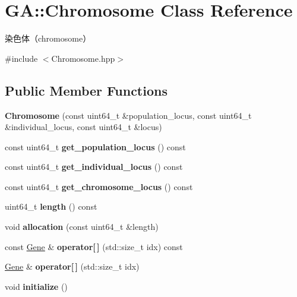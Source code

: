 \hypertarget{class_g_a_1_1_chromosome}{}\section{GA\+::Chromosome Class Reference}
\label{class_g_a_1_1_chromosome}


染色体（chromosome）  




{\ttfamily \#include $<$Chromosome.\+hpp$>$}

\subsection*{Public Member Functions}
\begin{DoxyCompactItemize}
\item 
\mbox{\label{class_g_a_1_1_chromosome_a88fbe9d3924eeb11bfdb10882dbf6b40}} 
{\bfseries Chromosome} (const uint64\+\_\+t \&population\+\_\+locus, const uint64\+\_\+t \&individual\+\_\+locus, const uint64\+\_\+t \&locus)
\item 
\mbox{\label{class_g_a_1_1_chromosome_a42d70e39ac609f2083775a3bf24ab102}} 
const uint64\+\_\+t {\bfseries get\+\_\+population\+\_\+locus} () const
\item 
\mbox{\label{class_g_a_1_1_chromosome_a01ec410db0534ba16a838eec2289befb}} 
const uint64\+\_\+t {\bfseries get\+\_\+individual\+\_\+locus} () const
\item 
\mbox{\label{class_g_a_1_1_chromosome_aba0e559017f6bb4d0f9cbf110e8ba593}} 
const uint64\+\_\+t {\bfseries get\+\_\+chromosome\+\_\+locus} () const
\item 
\mbox{\label{class_g_a_1_1_chromosome_a5bb683031addbb164e60a84ea13a347c}} 
uint64\+\_\+t {\bfseries length} () const
\item 
\mbox{\label{class_g_a_1_1_chromosome_abb1b0748d92e1b5a9d65ecc41a2e39ff}} 
void {\bfseries allocation} (const uint64\+\_\+t \&length)
\item 
\mbox{\label{class_g_a_1_1_chromosome_a7291c0601f5759b6f84f656440c33b1f}} 
const \mbox{\hyperlink{class_g_a_1_1_gene}{Gene}} \& {\bfseries operator\mbox{[}$\,$\mbox{]}} (std\+::size\+\_\+t idx) const
\item 
\mbox{\label{class_g_a_1_1_chromosome_a4601dbff60d4bb1c72a65aa5b43d9777}} 
\mbox{\hyperlink{class_g_a_1_1_gene}{Gene}} \& {\bfseries operator\mbox{[}$\,$\mbox{]}} (std\+::size\+\_\+t idx)
\item 
\mbox{\label{class_g_a_1_1_chromosome_ad2d253da87b08e855bfb0217e2df8219}} 
void {\bfseries initialize} ()
\end{DoxyCompactItemize}

